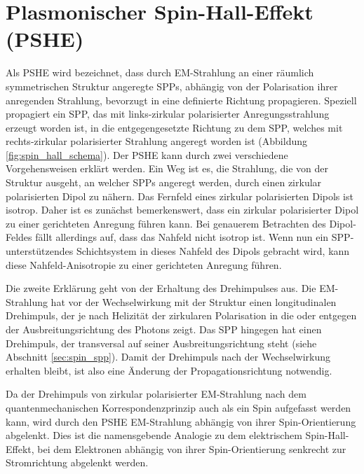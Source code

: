 \documentclass[a4paper, titlepage,  ngerman, fullpage]{book}
\begin{document}
	\section{Plasmonischer Spin-Hall-Effekt (PSHE)}
	Als PSHE wird bezeichnet, dass durch EM-Strahlung an einer räumlich symmetrischen Struktur angeregte SPPs, abhängig von der Polarisation ihrer anregenden Strahlung, bevorzugt in eine definierte Richtung propagieren. Speziell propagiert ein SPP, das mit links-zirkular polarisierter Anregungsstrahlung erzeugt worden ist, in die entgegengesetzte Richtung zu dem SPP, welches mit rechts-zirkular polarisierter Strahlung angeregt worden ist (Abbildung \ref{fig:spin_hall_schema}). Der PSHE kann durch zwei verschiedene Vorgehensweisen erklärt werden. Ein Weg ist es, die Strahlung, die von der Struktur ausgeht, an welcher SPPs angeregt werden, durch einen zirkular polarisierten Dipol zu nähern. Das Fernfeld eines zirkular polarisierten Dipols ist isotrop. Daher ist es zunächst bemerkenswert, dass ein zirkular polarisierter Dipol zu einer gerichteten Anregung führen kann. Bei genauerem Betrachten des Dipol-Feldes fällt allerdings auf, dass das Nahfeld nicht isotrop ist. Wenn nun ein SPP-unterstützendes Schichtsystem in dieses Nahfeld des Dipols gebracht wird, kann diese Nahfeld-Anisotropie zu einer gerichteten Anregung führen.
	
	Die zweite Erklärung geht von der Erhaltung des Drehimpulses aus. Die EM-Strahlung hat vor der Wechselwirkung mit der Struktur einen longitudinalen Drehimpuls, der je nach Helizität der zirkularen Polarisation in die oder entgegen der Ausbreitungsrichtung des Photons zeigt. Das SPP hingegen hat einen Drehimpuls, der transversal auf seiner Ausbreitungsrichtung steht (siehe Abschnitt \ref{sec:spin_spp}). Damit der Drehimpuls nach der Wechselwirkung erhalten bleibt, ist also eine Änderung der Propagationsrichtung notwendig. 
	
	Da der Drehimpuls von zirkular polarisierter EM-Strahlung nach dem quantenmechanischen Korrespondenzprinzip auch als ein Spin aufgefasst werden kann, wird durch den PSHE EM-Strahlung abhängig von ihrer Spin-Orientierung abgelenkt. Dies ist die namensgebende Analogie zu dem elektrischem Spin-Hall-Effekt, bei dem Elektronen abhängig von ihrer Spin-Orientierung senkrecht zur Stromrichtung abgelenkt werden\cite{Inoue.2005}.
\end{document}
